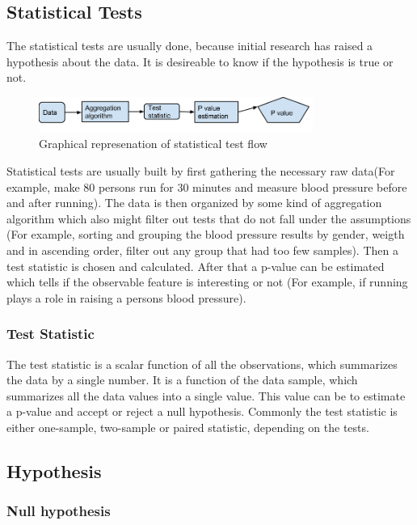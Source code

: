 \documentclass[12pt]{article}
\begin{document}
\subsection{Statistical Tests}

The statistical tests are usually done, because initial research has raised a hypothesis about the data. It is desireable to know if the hypothesis is true or not.

\begin{figure}[!h]
  \centering
  \includegraphics[width=0.8\textwidth]{statisticalTestFlow}
  \caption{Graphical represenation of statistical test flow}
  \label{fig:statisticalTestFlow}
\end{figure}

Statistical tests are usually built by first gathering the necessary raw data(For example, make 80 persons run for 30 minutes and measure blood pressure before and after running). The data is then organized by some kind of aggregation algorithm which also might filter out tests that do not fall under the assumptions (For example, sorting and grouping the blood pressure results by gender, weigth and in ascending order, filter out any group that had too few samples). Then a test statistic is chosen and calculated. After that a p-value can be estimated which tells if the observable feature is interesting or not (For example, if running plays a role in raising a persons blood pressure).

\subsubsection{Test Statistic}

The test statistic is a scalar function of all the observations, which summarizes the data by a single number. It is a function of the data sample, which summarizes all the data values into a single value. This value can be to estimate a p-value and accept or reject a null hypothesis. Commonly the test statistic is either one-sample, two-sample or paired statistic, depending on the tests.

\subsection{Hypothesis}

\subsubsection{Null hypothesis}
\end{document}
